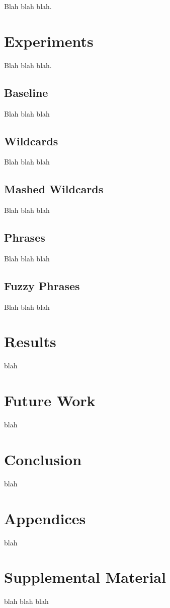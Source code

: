 \documentclass[11pt,a4paper]{article}
\begin{document}
Blah blah blah.

\section{Experiments}

Blah blah blah.

\subsection{Baseline}

Blah blah blah

\subsection{Wildcards}

Blah blah blah

\subsection{Mashed Wildcards}

Blah blah blah

\subsection{Phrases}

Blah blah blah

\subsection{Fuzzy Phrases}

Blah blah blah

\section{Results}

blah

\section{Future Work}

blah

\section{Conclusion}

blah




\appendix

\section{Appendices}
\label{sec:appendix}

blah 

\section{Supplemental Material}
\label{sec:supplemental}
blah blah blah
\end{document}
